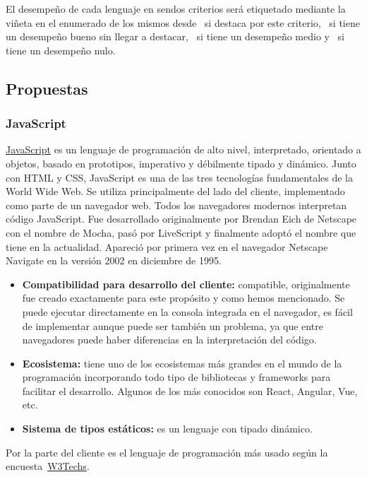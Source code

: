 El desempeño de cada lenguaje en sendos criterios será etiquetado mediante la viñeta en el enumerado de los mismos desde \esp~si destaca por este criterio, \bien~si tiene un desempeño bueno sin llegar a destacar, \regular~si tiene un desempeño medio y \mal~si tiene un desempeño nulo.

\subsection{Propuestas}

\subsubsection{JavaScript}

\href{https://es.wikipedia.org/w/index.php?title=JavaScript&oldid=161023746}{JavaScript} es un lenguaje de programación de alto nivel, interpretado, orientado a objetos, basado en prototipos, imperativo y débilmente tipado y dinámico. Junto con HTML y CSS, JavaScript es una de las tres tecnologías fundamentales de la World Wide Web. Se utiliza principalmente del lado del cliente, implementado como parte de un navegador web. Todos los navegadores modernos interpretan código JavaScript. Fue desarrollado originalmente por Brendan Eich de Netscape con el nombre de Mocha, pasó por LiveScript y finalmente adoptó el nombre que tiene en la actualidad. Apareció por primera vez en el navegador Netscape Navigate en la versión 2002 en diciembre de 1995.

\begin{itemize}
    \item[\esp] \textbf{Compatibilidad para desarrollo del cliente:} compatible, originalmente fue creado exactamente para este propósito y como hemos mencionado. Se puede ejecutar directamente en la consola integrada en el navegador, es fácil de implementar aunque puede ser también un problema, ya que entre navegadores puede haber diferencias en la interpretación del código.
    \item[\esp] \textbf{Ecosistema:} tiene uno de los ecosistemas más grandes en el mundo de la programación incorporando todo tipo de bibliotecas y frameworks para facilitar el desarrollo. Algunos de los más conocidos son React, Angular, Vue, etc.
    \item[\mal] \textbf{Sistema de tipos estáticos:} es un lenguaje con tipado dinámico.
\end{itemize}

Por la parte del cliente es el lenguaje de programación más usado según la encuesta~\href{https://w3techs.com/technologies/overview/client_side_language}{W3Techs}.

